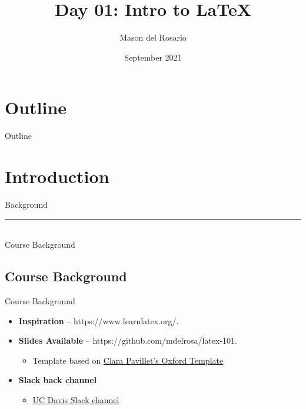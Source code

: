 \documentclass{beamer}
\title{Day 01: Intro to \LaTeX }
\author{\small{Mason del Rosario}}
\institute{\LaTeX 101}
\date{September 2021} %
\begin{document}
\footnotesize{
% 


{ 
\frame{\titlepage}}

\section*{Outline}\begin{frame}{Outline}\tableofcontents\end{frame}

\section{Introduction}

  \begin{frame}[plain]
    \vfill
    \centering
    \begin{beamercolorbox}[sep=8pt,center,shadow=true,rounded=true]{Background}
      \insertsectionhead\par%
      \color{davisblue}\noindent\rule{10cm}{1pt} \\
      \footnotesize{Course Background}
    \end{beamercolorbox}
    \vfill
  \end{frame}
  
\subsection{Course Background}

  \begin{frame}{Course Background}
    \begin{itemize} 
      \item \textbf{Inspiration} -- https://www.learnlatex.org/. 
      \item \textbf{Slides Available} -- https://github.com/mdelrosa/latex-101.
      \begin{itemize}
        \item Template based on \href{https://www.overleaf.com/latex/templates/oxpav/xnjgrxthvjhg}{Clara Pavillet's Oxford Template}
      \end{itemize}
      \item \textbf{Slack back channel}
      \begin{itemize}
        \item \href{https://join.slack.com/share/zt-ul82okyc-SI2GftuwPx_lFyBXll9rjw}{UC Davis Slack channel}
      \end{itemize}
    \end{itemize}
  \end{frame}

}
\end{document}
